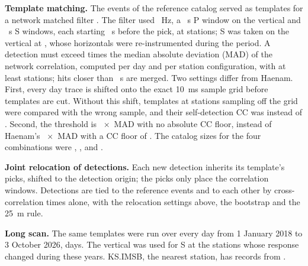 \documentclass[11pt,a4paper]{article}
\begin{document}
\textbf{Template matching.} The  events of the reference catalog served as templates for a network matched filter \citep{Beauce2018}. The filter used ~Hz, a ~s P window on the vertical and ~s S windows, each starting ~s before the pick, at  stations; S was taken on the vertical at , whose horizontals were re-instrumented during the period. A detection must exceed  times the median absolute deviation (MAD) of the network correlation, computed per day and per station configuration, with at least  stations; hits closer than ~s are merged. Two settings differ from Haenam. First, every day trace is shifted onto the exact 10~ms sample grid before templates are cut. Without this shift, templates at stations sampling off the grid were compared with the wrong sample, and their self-detection CC was  instead of . Second, the threshold is ~$\times$~MAD with no absolute CC floor, instead of Haenam's ~$\times$~MAD with a CC floor of . The catalog sizes for the four combinations were , ,  and .

\textbf{Joint relocation of detections.} Each new detection inherits its template's picks, shifted to the detection origin; the picks only place the correlation windows. Detections are tied to the  reference events and to each other by cross-correlation times alone, with the relocation settings above, the bootstrap and the 25~m rule.

\textbf{Long scan.} The same templates were run over every day from 1 January 2018 to 3 October 2026,  days. The vertical was used for S at the  stations whose response changed during these years. KS.IMSB, the nearest station, has records from .
\end{document}

